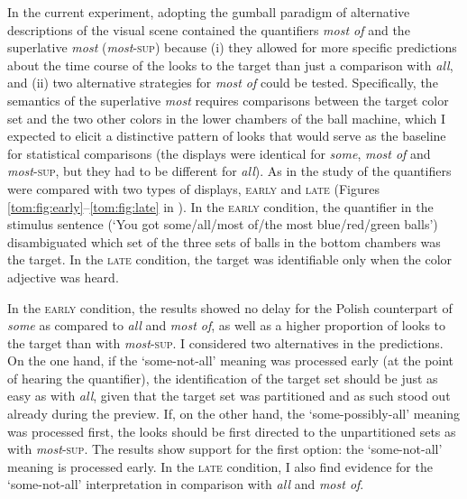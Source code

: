 \documentclass[output=paper]{langscibook}
\begin{document}
In the current experiment, adopting the gumball paradigm of \citet{degen2011making,degen2016availability} alternative descriptions of
the visual scene contained the quantifiers \textit{most of} and the superlative \textit{most
}(\textit{most}\textsc{-sup}) because (i) they allowed for more specific predictions about the time course of the
looks to the target than just a comparison with \textit{all}, and (ii) two alternative strategies for \textit{most of}
could be tested. Specifically, the semantics of the superlative \textit{most} requires comparisons between the target
color set and the two other colors in the lower chambers of the ball machine, which I expected to elicit a
distinctive pattern of looks that would serve as the baseline for statistical comparisons (the displays were identical
for \textit{some}, \textit{most of} and \textit{most}\textsc{-sup}, but they had to be different for \textit{all}).
As in the study of \citet{degen2016availability} the quantifiers were compared with two types of displays, \textsc{early} and \textsc{late}
(Figures \ref{tom:fig:early}--\ref{tom:fig:late} in ). In the \textsc{early} condition, the quantifier in the stimulus sentence (`You got
some/all/most of/the most blue/red/green balls') disambiguated which set of the three sets of balls in
the bottom chambers was the target. In the \textsc{late} condition, the target was identifiable only when the color adjective was
heard. 

In the \textsc{early} condition, the results showed no delay for the Polish counterpart of \textit{some} as compared to
\textit{all} and \textit{most of}, as well as a higher proportion of looks to the target than with
\textit{most}\textsc{-sup}. I considered two alternatives in the predictions. On the one hand, if the
`some-not-all' meaning was processed early (at the point of hearing the quantifier), the identification of the
target set should be just as easy as with \textit{all}, given that the target set was partitioned and as such stood out
already during the preview. If, on the other hand, the `some-possibly-all' meaning was processed
first, the looks should be first directed to the unpartitioned sets as with \textit{most}\textsc{-sup}. The results
show support for the first option: the `some-not-all' meaning is processed early. In the \textsc{late} condition, I also
find evidence for the `some-not-all' interpretation in comparison with \textit{all} and \textit{most of}.
\end{document}
